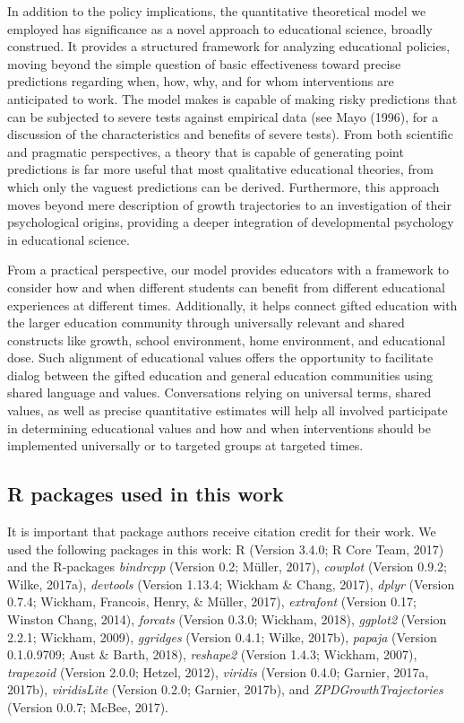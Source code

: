 \documentclass[english,floatsintext,jou]{apa6}
\theoremstyle{definition}
\theoremstyle{definition}
\theoremstyle{definition}
\theoremstyle{remark}
\begin{document}
In addition to the policy implications, the quantitative theoretical
model we employed has significance as a novel approach to educational
science, broadly construed. It provides a structured framework for
analyzing educational policies, moving beyond the simple question of
basic effectiveness toward precise predictions regarding when, how, why,
and for whom interventions are anticipated to work. The model makes is
capable of making risky predictions that can be subjected to severe
tests against empirical data (see Mayo (1996), for a discussion of the
characteristics and benefits of severe tests). From both scientific and
pragmatic perspectives, a theory that is capable of generating point
predictions is far more useful that most qualitative educational
theories, from which only the vaguest predictions can be derived.
Furthermore, this approach moves beyond mere description of growth
trajectories to an investigation of their psychological origins,
providing a deeper integration of developmental psychology in
educational science.

From a practical perspective, our model provides educators with a
framework to consider how and when different students can benefit from
different educational experiences at different times. Additionally, it
helps connect gifted education with the larger education community
through universally relevant and shared constructs like growth, school
environment, home environment, and educational dose. Such alignment of
educational values offers the opportunity to facilitate dialog between
the gifted education and general education communities using shared
language and values. Conversations relying on universal terms, shared
values, as well as precise quantitative estimates will help all involved
participate in determining educational values and how and when
interventions should be implemented universally or to targeted groups at
targeted times.

\subsection{R packages used in this
work}\label{r-packages-used-in-this-work}

It is important that package authors receive citation credit for their
work. We used the following packages in this work: R (Version 3.4.0; R
Core Team, 2017) and the R-packages \emph{bindrcpp} (Version 0.2;
Müller, 2017), \emph{cowplot} (Version 0.9.2; Wilke, 2017a),
\emph{devtools} (Version 1.13.4; Wickham \& Chang, 2017), \emph{dplyr}
(Version 0.7.4; Wickham, Francois, Henry, \& Müller, 2017),
\emph{extrafont} (Version 0.17; Winston Chang, 2014), \emph{forcats}
(Version 0.3.0; Wickham, 2018), \emph{ggplot2} (Version 2.2.1; Wickham,
2009), \emph{ggridges} (Version 0.4.1; Wilke, 2017b), \emph{papaja}
(Version 0.1.0.9709; Aust \& Barth, 2018), \emph{reshape2} (Version
1.4.3; Wickham, 2007), \emph{trapezoid} (Version 2.0.0; Hetzel, 2012),
\emph{viridis} (Version 0.4.0; Garnier, 2017a, 2017b),
\emph{viridisLite} (Version 0.2.0; Garnier, 2017b), and
\emph{ZPDGrowthTrajectories} (Version 0.0.7; McBee, 2017).
\end{document}
